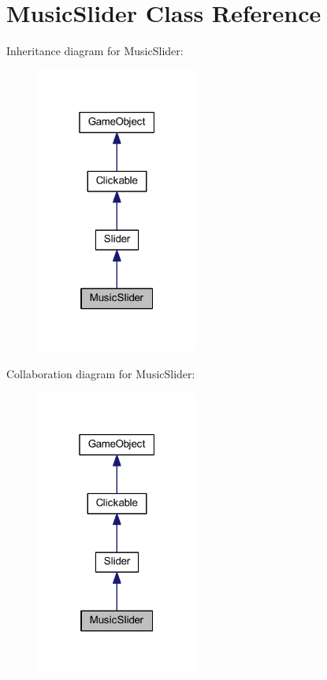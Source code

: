 \hypertarget{class_music_slider}{\section{Music\+Slider Class Reference}
\label{class_music_slider}
}


Inheritance diagram for Music\+Slider\+:
\nopagebreak
\begin{figure}[H]
\begin{center}
\leavevmode
\includegraphics[width=151pt]{class_music_slider__inherit__graph}
\end{center}
\end{figure}


Collaboration diagram for Music\+Slider\+:
\nopagebreak
\begin{figure}[H]
\begin{center}
\leavevmode
\includegraphics[width=151pt]{class_music_slider__coll__graph}
\end{center}
\end{figure}
